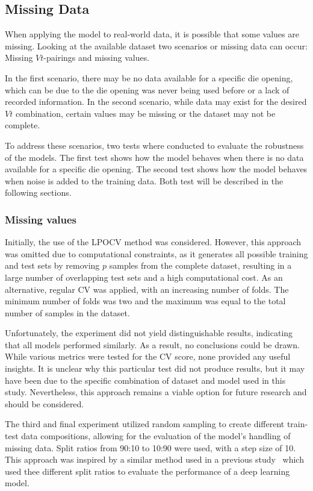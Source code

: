 \subsection{Missing Data}\label{subsec:missing-data}
When applying the model to real-world data, it is possible that some values are missing.
Looking at the available dataset two scenarios or missing data can occur:
Missing $Vt$-pairings and missing values.

In the first scenario, there may be no data available for a specific die opening, which can be due to the die opening
was never being used before or a lack of recorded information.
In the second scenario, while data may exist for the desired $Vt$ combination, certain values may
be missing or the dataset may not be complete.

To address these scenarios, two tests where conducted to evaluate the robustness of the models.
The first test shows how the model behaves when there is no data available for a specific die opening.
The second test shows how the model behaves when noise is added to the training data.
Both test will be described in
the following sections.

\subsubsection{Missing values}

Initially, the use of the \ac{LPOCV} method was considered.
However, this approach was omitted due to computational constraints, as it generates all possible
training and test sets by removing $p$ samples from the complete dataset, resulting in a large
number of overlapping test sets and a high computational cost.
As an alternative, regular CV was applied, with an increasing number of folds.
The minimum number of folds was two and the maximum was equal to the total number of samples in the
dataset.

Unfortunately, the experiment did not yield distinguishable results, indicating that all models performed similarly.
As a result, no conclusions could be drawn.
While various metrics were tested for the CV score, none provided any useful insights.
It is unclear why this particular test did not produce results, but it may have been due to the specific combination
of dataset and model used in this study.
Nevertheless, this approach remains a viable option for future research and should be considered.

The third and final experiment utilized random sampling to create different train-test data compositions, allowing
for the evaluation of the model's handling of missing data.
Split ratios from 90:10 to 10:90 were used, with a step size of 10.
This approach was inspired by a similar method used in a previous study~\cite[p. 570--574]{liu2021deep}  which used
thee different split ratios to evaluate the performance of a deep learning model.

